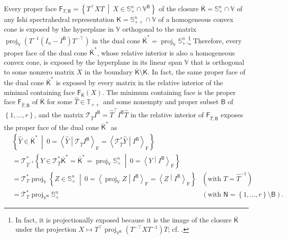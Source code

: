 \documentclass[oneside]{amsart}
\theoremstyle{plain}
\theoremstyle{definition}
\theoremstyle{remark}
\numberwithin{equation}{section}
\DeclareMathOperator{\proj}{proj}
\begin{document}
Every proper face $\mathsf{F}_{T,\mathsf{B}} = \left\{T^{\top} X T\
\middle|\ X \in \mathbb{S}^{n}_{+} \cap \mathbb{V}^{\mathsf{B}}\right\}$ of
the closure $\bar{\mathsf{K}} = \mathbb{S}^{n}_{+} \cap \mathbb{V}$ of any
Ishi spectrahedral representation $\mathsf{K} = \mathbb{S}^{n}_{++} \cap
\mathbb{V}$ of a homogeneous convex cone is exposed by the hyperplane in
$\mathbb{V}$ orthogonal to the matrix $\proj_{\mathbb{V}}\left( T^{-1}
(I_{n} - I^{\mathsf{B}}) T^{-\top} \right)$ in the dual cone
$\bar{\mathsf{K}}^{*} = \proj_{\mathbb{V}} \mathbb{S}^{n}_{+}$.\footnote{In
fact, it is projectionally exposed because it is the image of the closure
$\bar{\mathsf{K}}$ under the projection $X \mapsto T^{\top}
\proj_{\mathbb{V}^{\mathsf{B}}}\left( T^{-\top} X T^{-1} \right) T$; cf.\@
\cite[Theorem~3.6]{GouItoLou25}.} Therefore, every proper face of the dual
cone $\bar{\mathsf{K}}^{*}$, whose relative interior is also a homogeneous
convex cone, is exposed by the hyperplane in its linear span $\mathbb{V}$
that is orthogonal to some nonzero matrix $X$ in the boundary
$\bar{\mathsf{K}} \setminus \mathsf{K}$. In fact, the same proper face of
the dual cone $\bar{\mathsf{K}}^{*}$ is exposed by every matrix in the
relative interior of the minimal containing face
$\mathsf{F}_{\bar{\mathsf{K}}}(X)$. The minimum containing face is the
proper face $\mathsf{F}_{\hat{T},\mathsf{B}}$ of $\bar{\mathsf{K}}$ for
some $\hat{T} \in \mathbb{T}_{++}$ and some nonempty and proper subset
$\mathsf{B}$ of $\left\{1, \dotsc, r\right\}$, and the matrix
$\mathcal{T}_{\hat{T}}I^{\mathsf{B}} = \hat{T}^{\top} I^{\mathsf{B}}
\hat{T}$ in the relative interior of $\mathsf{F}_{\hat{T},\mathsf{B}}$
exposes the proper face of the dual cone $\bar{\mathsf{K}}^{*}$ as
\[
\begin{aligned}
&\left\{\hat{Y} \in \bar{\mathsf{K}}^{*}\ \middle|\ 0 = \left\langle
\hat{Y} \middle| \mathcal{T}_{\hat{T}} I^{\mathsf{B}}
\right\rangle_{\mathrm{F}} = \left\langle \mathcal{T}^{*}_{\hat{T}} \hat{Y}
\middle| I^{\mathsf{B}} \right\rangle_{\mathrm{F}}\right\}
\\
&= \mathcal{T}^{*}_{\hat{T}^{-1}} \left\{Y \in \mathcal{T}^{*}_{\hat{T}}
\bar{\mathsf{K}}^{*} = \bar{\mathsf{K}}^{*} = \proj_{\mathbb{V}}
\mathbb{S}^{n}_{+}\ \middle|\ 0 = \left\langle Y \middle| I^{\mathsf{B}}
\right\rangle_{\mathrm{F}}\right\}
\\
&= \mathcal{T}^{*}_{T} \proj_{\mathbb{V}} \left\{Z \in \mathbb{S}^{n}_{+}\
\middle|\ 0 = \left\langle \proj_{\mathbb{V}} Z \middle| I^{\mathsf{B}}
\right\rangle_{\mathrm{F}} = \left\langle Z \middle| I^{\mathsf{B}}
\right\rangle_{\mathrm{F}}\right\} & (\text{with } T = \hat{T}^{-1})
\\
&= \mathcal{T}^{*}_{T} \proj_{\mathbb{V}^{\mathsf{N}}} \mathbb{S}^{n}_{+} &
(\text{with } \mathsf{N} = \left\{1, \dotsc, r\right\} \setminus
\mathsf{B}).
\end{aligned}
\]
\end{document}
